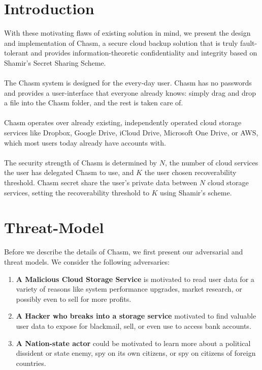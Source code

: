 \documentclass[letterpaper,twocolumn,10pt]{article}
\begin{document}
\section{Introduction}
With these motivating flaws of existing solution in mind, we present the design and implementation of Chasm, a secure cloud backup solution that is truly fault-tolerant and provides information-theoretic confidentiality and integrity based on Shamir's Secret Sharing Scheme.
\\\\
The Chasm system is designed for the every-day user. Chasm has no passwords and provides a user-interface that everyone already knows: simply drag and drop a file into the Chasm folder, and the rest is taken care of.
\\\\
Chasm operates over already existing, independently operated cloud storage services like Dropbox, Google Drive, iCloud Drive, Microsoft One Drive, or AWS, which most users today already have accounts with.
\\\\
The security strength of Chasm is determined by $N$, the number of cloud services the user has delegated Chasm to use, and $K$ the user chosen recoverability threshold. Chasm secret share the user's private data between $N$ cloud storage services, setting the recoverability threshold to $K$ using Shamir's scheme.

\section{Threat-Model}
Before we describe the details of Chasm, we first present our adversarial and threat models. We consider the following adversaries:
\begin{enumerate}

	\item {\bf A Malicious Cloud Storage Service} is motivated to read user data for a variety of reasons like system performance upgrades, market research, or possibly even to sell for more profits.

	\item {\bf A Hacker who breaks into a storage service} motivated to find valuable user data to expose for blackmail, sell, or even use to access bank accounts.

	\item {\bf A Nation-state actor} could be motivated to learn more about a political dissident or state enemy, spy on its own citizens, or spy on citizens of foreign countries.
\end{enumerate}
\end{document}
